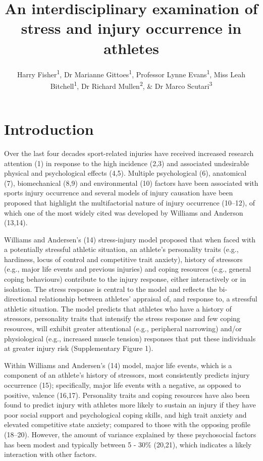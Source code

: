 \documentclass[
  english,
  man]{apa6}
\title{An interdisciplinary examination of stress and injury occurrence in athletes}
\author{Harry Fisher\textsuperscript{1}, Dr Marianne Gittoes\textsuperscript{1}, Professor Lynne Evans\textsuperscript{1}, Miss Leah Bitchell\textsuperscript{1}, Dr Richard Mullen\textsuperscript{2}, \& Dr Marco Scutari\textsuperscript{3}}
\date{}
\affiliation{\vspace{0.5cm}\textsuperscript{1} Cardiff Metropolitan University\\\textsuperscript{2} Brunel University\\\textsuperscript{3} Istituto Dalle Molle di Studi sull'Intelligenza Artificiale (IDSIA)}
\begin{document}
\maketitle

\hypertarget{introduction}{%
\section{Introduction}\label{introduction}}

Over the last four decades sport-related injuries have received increased research attention (1) in response to the high incidence (2,3) and associated undesirable physical and psychological effects (4,5).
Multiple psychological (6), anatomical (7), biomechanical (8,9) and environmental (10) factors have been associated with sports injury occurrence and several models of injury causation have been proposed that highlight the multifactorial nature of injury occurrence (10--12), of which one of the most widely cited was developed by Williams and Anderson (13,14).

Williams and Andersen's (14) stress-injury model proposed that when faced with a potentially stressful athletic situation, an athlete's personality traits (e.g., hardiness, locus of control and competitive trait anxiety), history of stressors (e.g., major life events and previous injuries) and coping resources (e.g., general coping behaviours) contribute to the injury response, either interactively or in isolation.
The stress response is central to the model and reflects the bi-directional relationship between athletes' appraisal of, and response to, a stressful athletic situation.
The model predicts that athletes who have a history of stressors, personality traits that intensify the stress response and few coping resources, will exhibit greater attentional (e.g., peripheral narrowing) and/or physiological (e.g., increased muscle tension) responses that put these individuals at greater injury risk (Supplementary Figure 1).

Within Williams and Andersen's (14) model, major life events, which is a component of an athlete's history of stressors, most consistently predicts injury occurrence (15); specifically, major life events with a negative, as opposed to positive, valence (16,17).
Personality traits and coping resources have also been found to predict injury with athletes more likely to sustain an injury if they have poor social support and psychological coping skills, and high trait anxiety and elevated competitive state anxiety; compared to those with the opposing profile (18--20).
However, the amount of variance explained by these psychosocial factors has been modest and typically between 5 - 30\% (20,21), which indicates a likely interaction with other factors.
\end{document}
